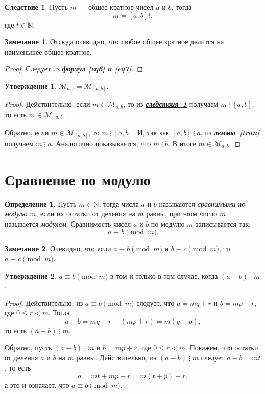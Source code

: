 \documentclass[14pt, a4paper]{extarticle}
\theoremstyle{definition}
\newtheorem*{definition}{Определение}
\newtheorem*{remark}{Замечание}
\newtheorem{corollary}{Следствие}[theorem]
\newtheorem{statement}{Утверждение}
\newcommand{\divisible}{\mathop{\vdots}}
\begin{document}
	\begin{corollary}
	\label{krat}
		Пусть $m$ --- общее кратное чисел $a$ и $b$, тогда $$m=[a,b]t,$$ где $t\in\mathbb{N}$.
	\end{corollary}
	\begin{remark}
		Отсюда очевидно, что любое общее кратное делится на наименьшее общее кратное.
	\end{remark}
	\begin{proof}
		Следует из \textbf{\textit{формул \ref{eq6} и \ref{eq7}}}.
	\end{proof}
	
	\begin{statement}
	\label{mnnok}
		$\mathcal{M}_{a,b}=\mathcal{M}_{[a,b]}$.
	\end{statement}
	\begin{proof}
		Действительно, если $m\in\mathcal{M}_{a,b}$, то из \hyperref[krat]{\textbf{\textit{следствия~\ref*{krat}}}} получаем $m\divisible[a,b]$, то есть $m\in\mathcal{M}_{[a,b]}$.
		
		Обратно, если $m\in\mathcal{M}_{[a,b]}$, то $m\divisible[a,b]$. И, так как $[a,b]\divisible a$, из \hyperref[tran]{\textbf{\textit{леммы~\ref*{tran}}}} получаем $m\divisible a$. Аналогично показывается, что $m\divisible b$. В итоге $m\in\mathcal{M}_{a,b}$.
	\end{proof}

\newpage
\section{Сравнение по модулю}
\label{mod}

	\begin{definition}
		Пусть $m\in\mathbb{N}$, тогда числа $a$ и $b$ называются \emph{сравнимыми по модулю} $m$, если их остатки от деления на $m$ равны, при этом число $m$ называется \emph{модулем}. Сравнимость чисел $a$ и $b$ по модулю $m$ записывается так: $$\boxed{a\equiv b\pmod{m}.}$$
	\end{definition}

	\begin{remark}
		Очевидно, что если $a\equiv b\pmod{m}$ и $b\equiv c\pmod{m}$, то $a\equiv c\pmod{m}$.
	\end{remark}

	\begin{statement}
		$a\equiv b\pmod{m}$ в том и только в том случае, когда $(a-b)\divisible m$.
	\end{statement}
	\begin{proof}
		Действительно, из $a\equiv b\pmod{m}$ следует, что \mbox{$a=mq+r$} и $b=mp+r$, где $0\leqslant r<m$. Тогда $$a-b=mq+r-(mp+r)=m(q-p),$$ то есть $(a-b)\divisible m$.
		
		Обратно, пусть $(a-b)\divisible m$ и $b=mp+r$, где $0\leqslant r<m$. Покажем, что остатки от деления $a$ и $b$ на $m$ равны. Действительно, из $(a-b)\divisible m$ следует $a-b=mt$, то есть $$a=mt+mp+r=m(t+p)+r,$$ а это и означает, что $a\equiv b\pmod{m}$.
	\end{proof}
\end{document}
